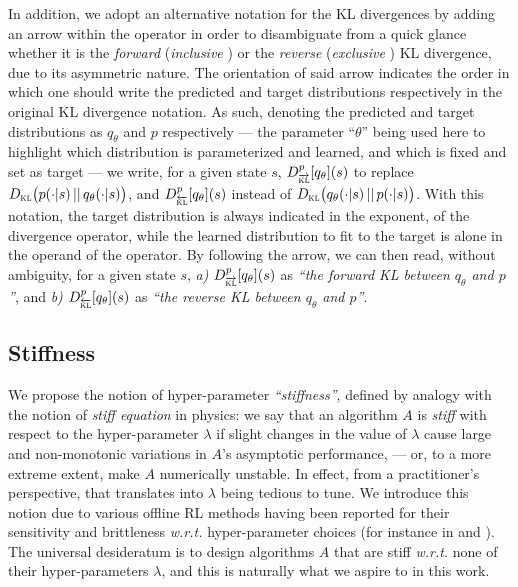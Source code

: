 In addition, we adopt an alternative notation for the KL divergences
by adding an arrow within the operator in order to disambiguate
from a quick glance whether it is the \textit{forward} (\textit{inclusive} \cite{MacKay2003-qn})
or the \textit{reverse} (\textit{exclusive} \cite{MacKay2003-qn})
KL divergence,
due to its asymmetric nature. The orientation of said arrow indicates the order in which one should write the
predicted and target distributions respectively in the original KL divergence notation.
As such, denoting the predicted and target distributions as $q_\theta$ and $p$ respectively
--- the parameter ``$\theta$'' being used here to highlight which distribution is
parameterized and learned, and which is fixed and set as target ---
we write, for a given state $s$,
$D^p_{\overrightarrow{\textsc{kl}}}[q_\theta](s)$
to replace $D_{\textsc{kl}}\big(p(\cdot | s) \, || \, q_\theta(\cdot | s)\big)$, and
$D^p_{\overleftarrow{\textsc{kl}}}[q_\theta](s)$
instead of $D_{\textsc{kl}}\big(q_\theta(\cdot | s) \, || \, p(\cdot | s)\big)$.
With this notation, the target distribution is always indicated in the exponent, of the divergence operator,
while the learned distribution to fit to the target is alone in the operand of the operator.
By following the arrow, we can then read, without ambiguity, for a given state $s$,
\textit{a)} $D^p_{\overrightarrow{\textsc{kl}}}[q_\theta](s)$ as
\textit{``the forward KL between $q_\theta$ and $p$''}, and
\textit{b)} $D^p_{\overleftarrow{\textsc{kl}}}[q_\theta](s)$ as
\textit{``the reverse KL between $q_\theta$ and $p$''}.

\subsection*{Stiffness}

We propose the notion of hyper-parameter \textit{``stiffness''}, defined by analogy with the notion
of \textit{stiff equation} in physics:
we say that an algorithm $A$ is \textit{stiff} with respect to the hyper-parameter
$\lambda$ if slight changes in the value of $\lambda$ cause large and non-monotonic
variations in $A$'s asymptotic performance,
--- or, to a more extreme extent, make $A$ numerically unstable.
In effect, from a practitioner's perspective, that translates into $\lambda$ being tedious to tune.
We introduce this notion due to various offline RL methods having been reported for their
sensitivity and brittleness \textit{w.r.t.} hyper-parameter choices
(for instance in \cite{Le_Paine2020-sb} and \cite{Monier2020-tq}).
The universal desideratum is to design algorithms $A$ that are stiff \textit{w.r.t.}
none of their hyper-parameters $\lambda$,
and this is naturally what we aspire to in this work.

